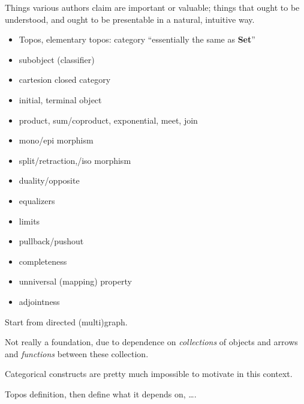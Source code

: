 \documentclass[11pt,openany]{article}
\begin{document}
Things various authors claim are important or valuable;
things that ought to be understood,
and ought to be presentable in a natural, intuitive way.

\begin{itemize}
  \item Topos, elementary topos: 
  category ``essentially the same as \textbf{Set}''
  \item subobject (classifier)
  \item cartesion closed category
  \item initial, terminal object
  \item product, sum/coproduct, exponential, meet, join
  \item mono/epi morphism
  \item split/retraction,/iso morphism
  \item duality/opposite
  \item equalizers
  \item limits
  \item pullback/pushout
  \item completeness
  \item unniversal (mapping) property
  \item adjointness
\end{itemize}
\setcounter{currentlevel}{\value{baseSectionLevel}}
\label{sec:Bottom-up}

Start from directed (multi)graph.

Not really a foundation, due to 
dependence on \textit{collections} of objects and arrows
and \textit{functions} between these collection. 

Categorical constructs are pretty much impossible to motivate
in this context.

\setcounter{currentlevel}{\value{baseSectionLevel}}
\label{sec:Topos-down}
 
Topos definition, then define what it depends on, \ldots.
 
\end{document}
